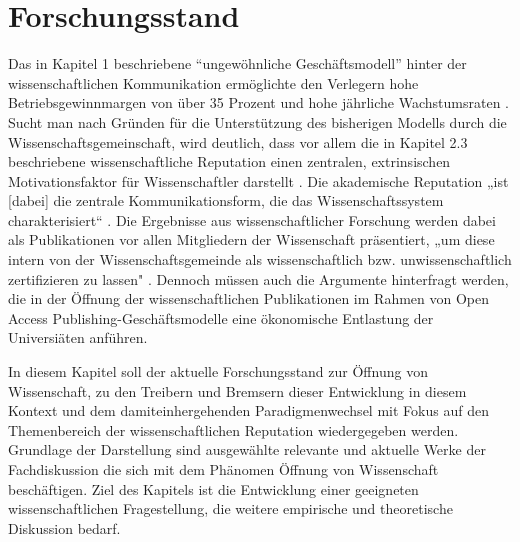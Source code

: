 \section{Forschungsstand}
Das in Kapitel 1 beschriebene “ungewöhnliche Geschäftsmodell” hinter der wissenschaftlichen Kommunikation ermöglichte den Verlegern hohe Betriebsgewinnmargen von über 35 Prozent  und hohe jährliche Wachstumsraten . Sucht man nach Gründen für die Unterstützung des bisherigen Modells durch die Wissenschaftsgemeinschaft, wird deutlich, dass vor allem die in Kapitel 2.3 beschriebene wissenschaftliche Reputation einen zentralen, extrinsischen Motivationsfaktor für Wissenschaftler darstellt . Die akademische Reputation „ist [dabei] die zentrale Kommunikationsform, die das Wissenschaftssystem charakterisiert“ . Die Ergebnisse aus wissenschaftlicher Forschung werden dabei als Publikationen vor allen Mitgliedern der Wissenschaft präsentiert, „um diese intern von der Wissenschaftsgemeinde als wissenschaftlich bzw. unwissenschaftlich zertifizieren zu lassen" . Dennoch müssen auch die Argumente hinterfragt werden, die in der Öffnung der wissenschaftlichen Publikationen im Rahmen von Open Access Publishing-Geschäftsmodelle eine ökonomische Entlastung der Universiäten anführen\cite{bauer2006}.

In diesem Kapitel soll der aktuelle Forschungsstand zur Öffnung von Wissenschaft, zu den Treibern und Bremsern dieser Entwicklung in diesem Kontext und dem damiteinhergehenden Paradigmenwechsel mit Fokus auf den Themenbereich der wissenschaftlichen Reputation wiedergegeben werden. Grundlage der Darstellung sind ausgewählte relevante und aktuelle Werke der Fachdiskussion die sich mit dem Phänomen Öffnung von Wissenschaft beschäftigen. Ziel des Kapitels ist die Entwicklung einer geeigneten wissenschaftlichen Fragestellung, die weitere empirische und theoretische Diskussion bedarf.
